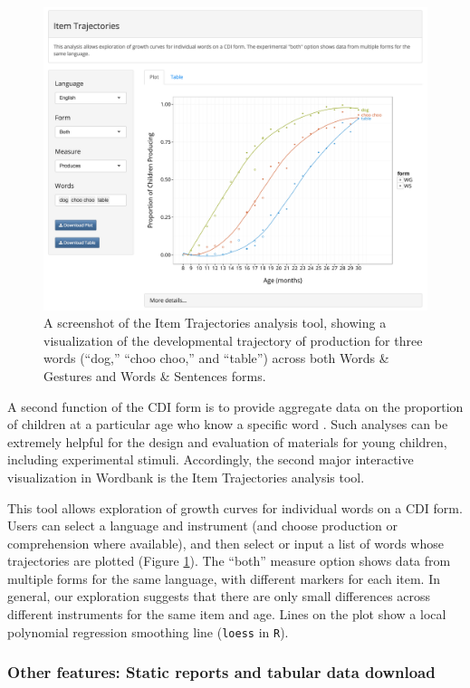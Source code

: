\documentclass[doc,noapacite]{apa2}
\begin{document}
\begin{figure}[t]
\includegraphics[width=6in]{figures/itemsapp.png}
\caption{\label{fig:items} A screenshot of the Item Trajectories analysis tool, showing a visualization of the developmental trajectory of production for three words (``dog,'' ``choo choo,'' and ``table'') across both Words \& Gestures and Words \& Sentences forms.}
\end{figure}

A second function of the CDI form is to provide aggregate data on the proportion of children at a particular age who know a specific word \cite{dale1996,jorgensen2010}. Such analyses can be extremely helpful for the design and evaluation of materials for young children, including experimental stimuli. Accordingly, the second major interactive visualization in Wordbank is the Item Trajectories analysis tool. 

This tool allows exploration of growth curves for individual words on a CDI form. Users can select a language and instrument (and choose production or comprehension where available), and then select or input a list of words whose trajectories are plotted (Figure \ref{fig:items}). The ``both'' measure option shows data from multiple forms for the same language, with different markers for each item. In general, our exploration suggests that there are only small differences across different instruments for the same item and age. Lines on the plot show a local polynomial regression smoothing line (\texttt{loess} in \texttt{R}). 

\subsubsection{Other features: Static reports and tabular data download}
\end{document}
